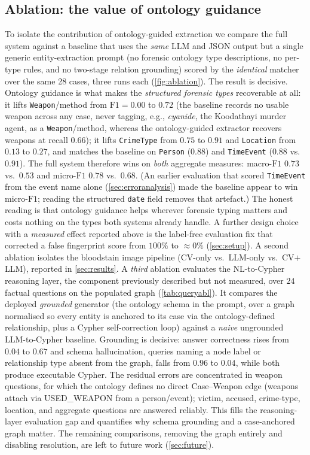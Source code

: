 \documentclass[conference]{IEEEtran}
\newcommand{\rel}[1]{\textup{\MakeUppercase{#1}}}
\newcommand{\node}[1]{\texttt{#1}}
\begin{document}
\subsection{Ablation: the value of ontology guidance}
\label{sec:ablation}
To isolate the contribution of ontology-guided extraction we compare the full
system against a baseline that uses the \emph{same} LLM and JSON output but a
single generic entity-extraction prompt (no forensic ontology type descriptions,
no per-type rules, and no two-stage relation grounding) scored by the
\emph{identical} matcher over the same 28 cases, three runs each
(\cref{fig:ablation}). The result is decisive. Ontology guidance is
what makes the \emph{structured forensic types} recoverable at all: it lifts
\node{Weapon}/method from $\mathrm{F1}=0.00$ to $0.72$ (the baseline records no
usable weapon across any case, never tagging, e.g., \emph{cyanide}, the Koodathayi
murder agent, as a \node{Weapon}/method, whereas the ontology-guided extractor
recovers weapons at recall $0.66$); it lifts \node{CrimeType} from $0.75$ to $0.91$
and \node{Location} from $0.13$ to $0.27$, and matches the baseline on
\node{Person} ($0.88$) and \node{TimeEvent} ($0.88$ vs.\ $0.91$). The full system
therefore wins on \emph{both} aggregate measures: macro-$\mathrm{F1}$
$0.73$ vs.\ $0.53$ and micro-$\mathrm{F1}$ $0.78$ vs.\ $0.68$. (An earlier
evaluation that scored \node{TimeEvent} from the event name alone
(\cref{sec:erroranalysis}) made the baseline appear to win micro-$\mathrm{F1}$;
reading the structured \texttt{date} field removes that artefact.) The honest
reading is that ontology guidance helps wherever forensic typing matters and costs
nothing on the types both systems already handle. A further
design choice with a \emph{measured} effect reported above is the label-free
evaluation fix that corrected a false fingerprint score from $100\%$ to
$\approx0\%$ (\cref{sec:setup}). A second ablation isolates the bloodstain image
pipeline (CV-only vs.\ LLM-only vs.\ CV$+$LLM), reported in \cref{sec:results}.
A \emph{third} ablation evaluates the NL-to-Cypher reasoning layer, the component
previously described but not measured, over $24$ factual questions on the populated
graph (\cref{tab:queryabl}). It compares the deployed \emph{grounded} generator
(the ontology schema in the prompt, over a graph normalised so every entity is
anchored to its case via the ontology-defined relationship, plus a Cypher
self-correction loop) against a \emph{naive} ungrounded LLM-to-Cypher baseline.
Grounding is decisive: answer correctness rises from $0.04$ to $\mathbf{0.67}$ and
schema hallucination, queries naming a node label or relationship type absent from
the graph, falls from $0.96$ to $\mathbf{0.04}$, while both produce executable
Cypher. The residual errors are concentrated in weapon questions, for which the
ontology defines no direct Case--Weapon edge (weapons attach via \rel{used\_weapon}
from a person/event); victim, accused, crime-type, location, and aggregate
questions are answered reliably. This fills the reasoning-layer evaluation gap and
quantifies why schema grounding and a case-anchored graph matter. The remaining
comparisons, removing the graph entirely and disabling resolution, are left to
future work (\cref{sec:future}).
\end{document}
